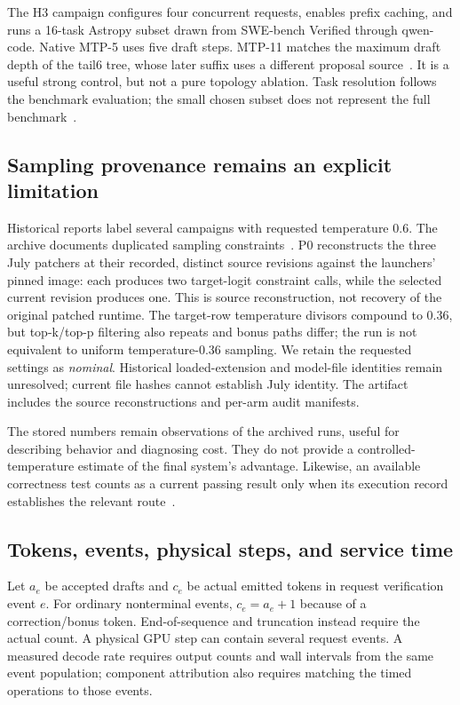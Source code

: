 \documentclass[conference]{IEEEtran}
\begin{document}
The H3 campaign configures four concurrent requests, enables prefix caching, and runs a 16-task Astropy subset drawn from SWE-bench Verified through qwen-code. Native MTP-5 uses five draft steps. MTP-11 matches the maximum draft depth of the tail6 tree, whose later suffix uses a different proposal source~\cite{lumo2026cost,lumo2026archive}. It is a useful strong control, but not a pure topology ablation. Task resolution follows the benchmark evaluation; the small chosen subset does not represent the full benchmark~\cite{jimenez2024swe}.

\subsection{Sampling provenance remains an explicit limitation}
Historical reports label several campaigns with requested temperature 0.6. The archive documents duplicated sampling constraints~\cite{lumo2026levers}. P0 reconstructs the three July patchers at their recorded, distinct source revisions against the launchers' pinned image: each produces two target-logit constraint calls, while the selected current revision produces one. This is source reconstruction, not recovery of the original patched runtime. The target-row temperature divisors compound to 0.36, but top-k/top-p filtering also repeats and bonus paths differ; the run is not equivalent to uniform temperature-0.36 sampling. We retain the requested settings as \emph{nominal}. Historical loaded-extension and model-file identities remain unresolved; current file hashes cannot establish July identity. The artifact includes the source reconstructions and per-arm audit manifests.

The stored numbers remain observations of the archived runs, useful for describing behavior and diagnosing cost. They do not provide a controlled-temperature estimate of the final system's advantage. Likewise, an available correctness test counts as a current passing result only when its execution record establishes the relevant route~\cite{lumo2026archive}.

\subsection{Tokens, events, physical steps, and service time}
Let $a_e$ be accepted drafts and $c_e$ be actual emitted tokens in request verification event $e$. For ordinary nonterminal events, $c_e=a_e+1$ because of a correction/bonus token. End-of-sequence and truncation instead require the actual count. A physical GPU step can contain several request events. A measured decode rate requires output counts and wall intervals from the same event population; component attribution also requires matching the timed operations to those events.
\end{document}
